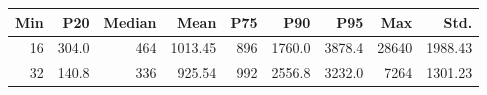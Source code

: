 
\begin{tabular}{r|r|r|r|r|r|r|r|r}
\hline
Min & P20 & Median & Mean & P75 & P90 & P95 & Max & Std.\\
\hline
16 & 304.0 & 464 & 1013.45 & 896 & 1760.0 & 3878.4 & 28640 & 1988.43\\
\hline
32 & 140.8 & 336 & 925.54 & 992 & 2556.8 & 3232.0 & 7264 & 1301.23\\
\hline
\end{tabular}
